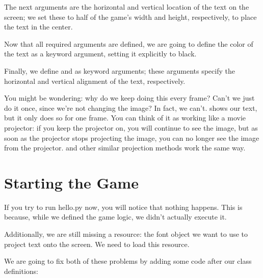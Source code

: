 \documentclass[letterpaper,10pt,english]{sphinxmanual}
\begin{document}
The next arguments are the horizontal and vertical location of the text
on the screen; we set these to half of the game's width and height,
respectively, to place the text in the center.

Now that all required arguments are defined, we are going to define the
color of the text as a keyword argument, setting it explicitly to black.

Finally, we define  and  as keyword arguments; these
arguments specify the horizontal and vertical alignment of the text,
respectively.

You might be wondering: why do we keep doing this every frame? Can't we
just do it once, since we're not changing the image? In fact, we can't.
{\hyperref[dsp:sge.dsp.Game.project_text]{\emph{}}} shows our text, but it only does so
for one frame.  You can think of it as working like a movie projector:
if you keep the projector on, you will continue to see the image, but as
soon as the projector stops projecting the image, you can no longer see
the image from the projector.  {\hyperref[dsp:sge.dsp.Game.project_text]{\emph{}}} and
other similar projection methods work the same way.


\section{Starting the Game}
\label{hello_world:starting-the-game}
If you try to run hello.py now, you will notice that nothing happens.
This is because, while we defined the game logic, we didn't actually
execute it.

Additionally, we are still missing a resource: the font object we want
to use to project text onto the screen.  We need to load this resource.

We are going to fix both of these problems by adding some code after our
class definitions:
\end{document}
